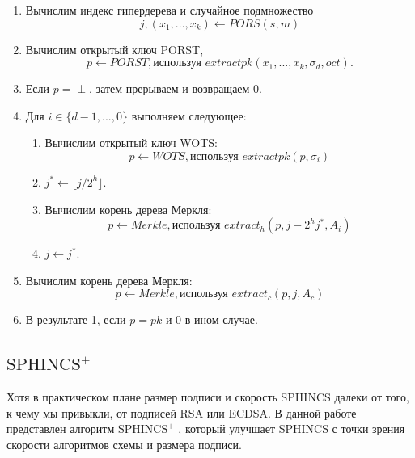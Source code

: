 \documentclass[a4paper, 14pt]{extarticle}
\begin{document}
\begin{itemize}
\begin{itemize}
        \begin{enumerate}
            \item Вычислим индекс гипердерева и случайное подмножество
            \[j, (x_{1}, ..., x_{k}) \leftarrow PORS(s,m)\]
    
            \item Вычислим открытый ключ PORST,
            \[p \leftarrow PORST, \text{используя } extractpk(x_{1}, ..., x_{k}, \sigma_{d}, oct).\]
    
            \item Если $p = \perp$, затем прерываем и возвращаем 0.
    
            \item Для $i \in \{d - 1, ..., 0\}$ выполняем следующее:
    
            \begin{enumerate}
                \item Вычислим открытый ключ WOTS:
                \[p \leftarrow WOTS, \text{используя } extractpk(p, \sigma_{i})\]
                \item $j^{*} \leftarrow \lfloor j/2^{h} \rfloor$.
                \item Вычислим корень дерева Меркля:
                \[p \leftarrow Merkle, \text{используя } extract_{h}(p, j - 2^{h}j^{*}, A_{i})\]
                \item $j \leftarrow j^{*}$.
            \end{enumerate}
    
            \item Вычислим корень дерева Меркля:
            \[p \leftarrow Merkle, \text{используя } extract_{c}(p, j, A_{c})\]
    
            \item В результате 1, если $p = pk$ и 0 в ином случае.
        \end{enumerate}
    \end{itemize}

    
\end{itemize}

\subsection{$\text{SPHINCS}^{+}$}
\label{sec_sphincsplus}
Хотя в практическом плане размер подписи и скорость SPHINCS далеки от того, к чему мы привыкли, от подписей RSA или ECDSA. В данной работе представлен алгоритм $\text{SPHINCS}^{+}$ \cite{stateless}, который улучшает SPHINCS с точки зрения скорости алгоритмов схемы и размера подписи.
\end{document}
